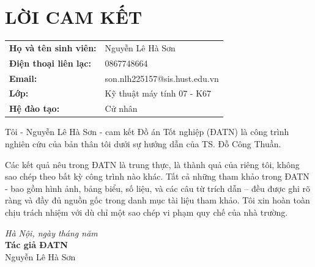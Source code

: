 \chapter*{LỜI CAM KẾT}

\begin{tabular}{ll}
\textbf{Họ và tên sinh viên:} & Nguyễn Lê Hà Sơn\\[6pt]
\textbf{Điện thoại liên lạc:} & 0867748664\\[6pt]
\textbf{Email:}               & son.nlh225157@sis.hust.edu.vn\\[6pt]
\textbf{Lớp:}                 & Kỹ thuật máy tính 07 - K67\\[6pt]
\textbf{Hệ đào tạo:}          & Cử nhân \\
\end{tabular}

\vspace{1.5cm}

Tôi - Nguyễn Lê Hà Sơn - cam kết Đồ án Tốt nghiệp (ĐATN) là công trình
nghiên cứu của bản thân tôi dưới sự hướng dẫn của TS. Đỗ Công Thuần.

Các kết quả nêu trong ĐATN là trung thực, là thành quả của riêng tôi,
không sao chép theo bất kỳ công trình nào khác. Tất cả những tham khảo
trong ĐATN - bao gồm hình ảnh, bảng biểu, số liệu, và các câu từ trích dẫn
-- đều được ghi rõ ràng và đầy đủ nguồn gốc trong danh mục tài liệu tham
khảo. Tôi xin hoàn toàn chịu trách nhiệm với dù chỉ một sao chép vi phạm
quy chế của nhà trường.

\vspace{2cm}
\begin{flushright}
\textit{Hà Nội, ngày \hspace{1cm} tháng \hspace{1cm} năm}\\[0.5cm]
\textbf{Tác giả ĐATN}\\[1.5cm]
Nguyễn Lê Hà Sơn
\end{flushright}

